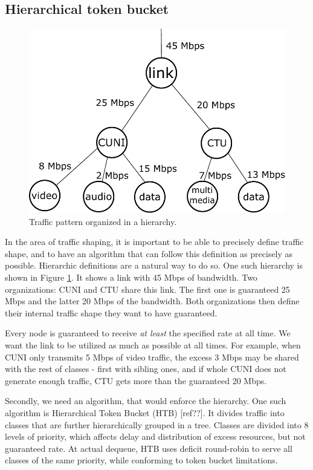 \subsection{Hierarchical token bucket}
\begin{figure}
	\centering
	\includegraphics[width=137mm]{drawings/hierarchy}
	\caption{Traffic pattern organized in a hierarchy.}
	
	\label{fig10:hierarchy}
\end{figure}
In the area of traffic shaping, it is important to be able to precisely define traffic shape, and to have an algorithm that can follow this definition as precisely as possible. Hierarchic definitions are a natural way to do so. One such hierarchy is shown in Figure \ref{fig10:hierarchy}. It shows a link with 45 Mbps of bandwidth. Two organizations: CUNI and CTU share this link. The first one is guaranteed 25 Mbps and the latter 20 Mbps of the bandwidth. Both organizations then define their internal traffic shape they want to have guaranteed.

Every node is guaranteed to receive \textit{at least} the specified rate at all time. We want the link to be utilized as much as possible at all times. For example, when CUNI only transmits 5 Mbps of video traffic, the excess 3 Mbps may be shared with the rest of classes - first with sibling ones, and if whole CUNI does not generate enough traffic, CTU gets more than the guaranteed 20 Mbps.


Secondly, we need an algorithm, that would enforce the hierarchy. One such algorithm is Hierarchical Token Bucket (HTB) [ref??]. It divides traffic into classes that are further hierarchically grouped in a tree. Classes are divided into 8 levels of priority, which affects delay and distribution of excess resources, but not guaranteed rate. At actual dequeue, HTB uses deficit round-robin to serve all classes of the same priority, while conforming to token bucket limitations.


